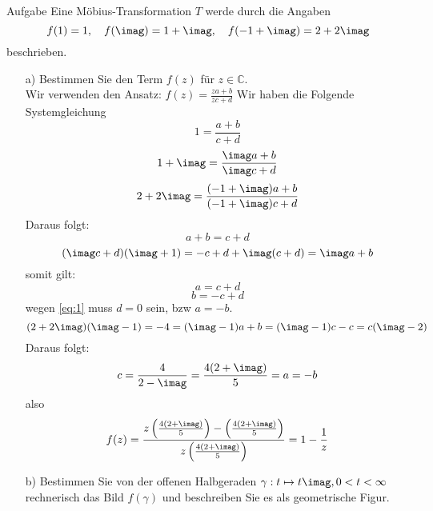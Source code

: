\documentclass{scrartcl}
\def\mbb#1{\mathbb{#1}}
\def\bC{\mbb{C}}
\begin{document}
\begin{section}{Aufgabe}%
Eine Möbius-Transformation $T$ werde durch die Angaben
\[f(1)=1,\quad f(\imag)=1+\imag,\quad f(-1+\imag)=2+2\imag\]
beschrieben.
\begin{itemize}
\item[a)]
Bestimmen Sie den Term $f(z)$ für $z \in \bC$.\\
Wir verwenden den Ansatz: \(f(z)=\frac{z a+b}{z c+d}\)
Wir haben die Folgende Systemgleichung
\[1=\frac{a+b}{c+d}\]
\[1+\imag=\frac{\imag a+b}{\imag c+d}\]
\[2+2\imag=\frac{(-1+\imag)a+b}{(-1+\imag)c+d}\]
Daraus folgt:
\begin{equation}
    a+b=c+d \label{eq:1}
\end{equation}
\[(\imag c+d)(\imag+1)=-c+d+\imag(c+d)=\imag a+b\]
somit gilt:
\[a=c+d\]
\[b=-c+d\]
wegen \eqref{eq:1} muss $d=0$ sein, bzw $a=-b$.
\[(2+2\imag)(\imag-1)=-4=(\imag-1)a+b=(\imag-1)c-c=c(\imag-2)\]
Daraus folgt:
\[c=\frac{4}{2-\imag}=\frac{4 (2+\imag)}{5}=a=-b\]
also
\[f(z)=\frac{z \left(\frac{4 (2+\imag)}{5}\right)-\left(\frac{4 (2+\imag)}{5}\right)}{z \left(\frac{4 (2+\imag)}{5}\right)}=1-\frac{1}{z}\]
\item[b)]
Bestimmen Sie von der offenen Halbgeraden $\gamma : t \mapsto t \imag, 0 < t < \infty$ rechnerisch
das Bild $f(\gamma)$ und beschreiben Sie es als geometrische Figur.

\end{itemize}
\end{section}
\end{document}
